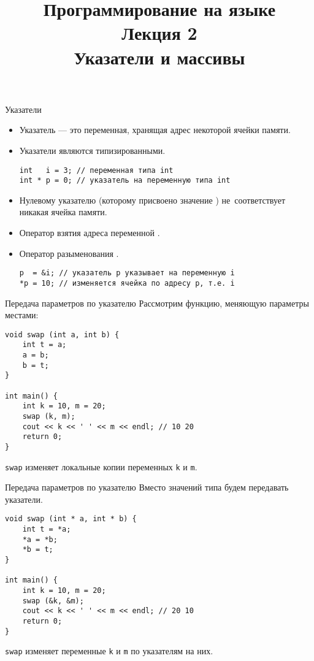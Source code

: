 \documentclass{beamer}
\title{{\bf Программирование на языке \langcpp\protect\\Лекция
2\protect\vspace{1em}\\}Указатели и массивы}
\begin{document}
\begin{frame} 
  \titlepage
\end{frame}


\begin{frame}[fragile]{Указатели}
    \begin{itemize}
        \item Указатель — это переменная, хранящая адрес некоторой 
            ячейки памяти.
           
        \item Указатели являются типизированными.
\begin{lstlisting}
int   i = 3; // переменная типа int
int * p = 0; // указатель на переменную типа int
\end{lstlisting}
        
        \item Нулевому указателю (которому присвоено значение ) не~соответствует никакая ячейка памяти.

        \item Оператор взятия адреса переменной \code{\&}.

        \item Оператор разыменования \code{*}.

\begin{lstlisting}
p  = &i; // указатель p указывает на переменную i
*p = 10; // изменяется ячейка по адресу p, т.е. i
\end{lstlisting}
    \end{itemize}

\end{frame}

\begin{frame}[fragile]{Передача параметров по указателю}
Рассмотрим функцию, меняющую параметры местами:
\begin{lstlisting}
void swap (int a, int b) {
    int t = a;
    a = b;
    b = t;
}

int main() {
    int k = 10, m = 20;
    swap (k, m);
    cout << k << ' ' << m << endl; // 10 20
    return 0;
}
\end{lstlisting}

{\tt swap} изменяет локальные копии переменных {\tt k} и {\tt m}.
\end{frame}

\begin{frame}[fragile]{Передача параметров по указателю}
    Вместо значений типа  будем передавать указатели.
\begin{lstlisting}
void swap (int * a, int * b) {
    int t = *a;
    *a = *b;
    *b = t;
}

int main() {
    int k = 10, m = 20;
    swap (&k, &m);
    cout << k << ' ' << m << endl; // 20 10
    return 0;
}
\end{lstlisting}

{\tt swap} изменяет переменные {\tt k} и {\tt m} по указателям на них.
\end{frame}
\end{document}
